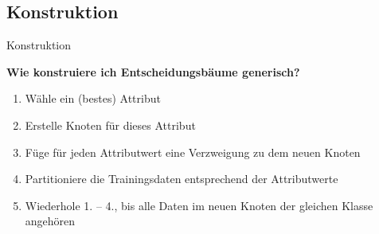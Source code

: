 \subsection{Konstruktion}
\begin{frame}{Konstruktion}

\textbf{Wie konstruiere ich Entscheidungsbäume generisch?}\\[2em]



\begin{algorithm}[H]
\caption{Konstruktion von Entscheidungsbäumen}
\begin{enumerate}[<+->]
    \item Wähle ein (bestes) Attribut
    \item Erstelle Knoten für dieses Attribut
    \item Füge für jeden Attributwert eine Verzweigung zu dem neuen Knoten
    \item Partitioniere die Trainingsdaten entsprechend der Attributwerte
    \item Wiederhole \textcolor{ohmblue}{1.} -- \textcolor{ohmblue}{4.}, bis alle Daten im neuen Knoten der gleichen Klasse angehören
\end{enumerate}
\end{algorithm}

\end{frame}


